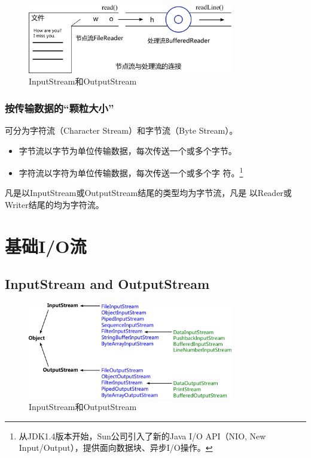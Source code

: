 \begin{figure}[htb]
\centering
\includegraphics[width=0.8\textwidth]{images/Advanced-IO-programming/fig-stream-link.pdf}
\caption{InputStream和OutputStream}
\label{fig:fig-stream-link}
\end{figure}

\subsubsection{按传输数据的“颗粒大小”}

{\hei 可分为字符流（Character Stream）和字节流（Byte Stream）。}

\begin{itemize}
\item 字节流以字节为单位传输数据，每次传送一个或多个字节。
\item 字符流以字符为单位传输数据，每次传送一个或多个字
  符。\footnote{从JDK1.4版本开始，Sun公司引入了新的Java I/O
    API（NIO, New Input/Output），提供面向数据块、异步I/O操作。}
\end{itemize}


凡是以InputStream或OutputStream结尾的类型均为{\hei 字节流}，凡是
以Reader或Writer结尾的均为{\hei 字符流。}

\section{基础I/O流}

\subsection{InputStream and OutputStream}

\begin{figure}[htb]
\centering
\includegraphics[width=0.8\textwidth]{images/Advanced-IO-programming/fig-io-input-and-output-stream.pdf}
\caption{InputStream和OutputStream}
\label{fig:fig-io-input-and-output-stream}
\end{figure}

